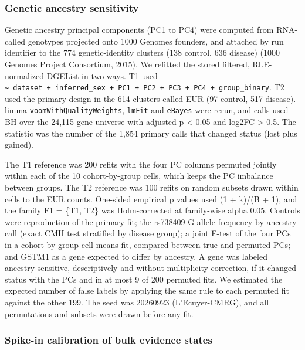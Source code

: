\subsubsection{Genetic ancestry sensitivity}\label{genetic-ancestry-sensitivity}

Genetic ancestry principal components (PC1 to PC4) were computed from RNA-called genotypes projected onto 1000 Genomes founders, and attached by run identifier to the 774 genetic-identity clusters (138 control, 636 disease) (1000 Genomes Project Consortium, 2015). We refitted the stored filtered, RLE-normalized DGEList in two ways. T1 used \texttt{\textasciitilde{}\ dataset\ +\ inferred\_\allowbreak{}sex\ +\ PC1\ +\ PC2\ +\ PC3\ +\ PC4\ +\ group\_\allowbreak{}binary}. T2 used the primary design in the 614 clusters called EUR (97 control, 517 disease). limma \texttt{voomWithQualityWeights}, \texttt{lmFit} and \texttt{eBayes} were rerun, and calls used BH over the 24,115-gene universe with adjusted p \textless{} 0.05 and \textbar log2FC\textbar{} \textgreater{} 0.5. The statistic was the number of the 1,854 primary calls that changed status (lost plus gained).

The T1 reference was 200 refits with the four PC columns permuted jointly within each of the 10 cohort-by-group cells, which keeps the PC imbalance between groups. The T2 reference was 100 refits on random subsets drawn within cells to the EUR counts. One-sided empirical p values used (1 + k)/(B + 1), and the family F1 = \{T1, T2\} was Holm-corrected at family-wise alpha 0.05. Controls were reproduction of the primary fit; the rs738409 G allele frequency by ancestry call (exact CMH test stratified by disease group); a joint F-test of the four PCs in a cohort-by-group cell-means fit, compared between true and permuted PCs; and GSTM1 as a gene expected to differ by ancestry. A gene was labeled ancestry-sensitive, descriptively and without multiplicity correction, if it changed status with the PCs and in at most 9 of 200 permuted fits. We estimated the expected number of false labels by applying the same rule to each permuted fit against the other 199. The seed was 20260923 (L'Ecuyer-CMRG), and all permutations and subsets were drawn before any fit.

\subsubsection{Spike-in calibration of bulk evidence states}\label{spike-in-calibration-of-bulk-evidence-states}

